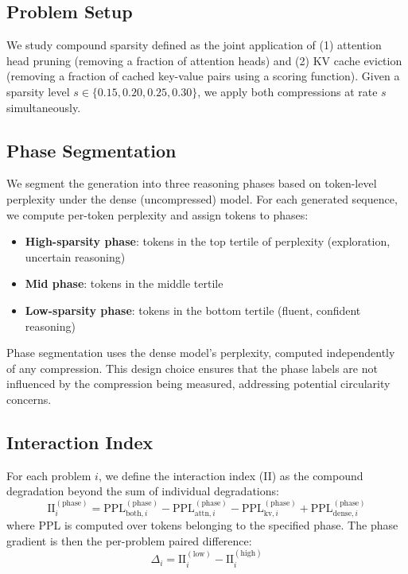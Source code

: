 \documentclass[11pt,a4paper]{article}
\begin{document}
\subsection{Problem Setup}

We study compound sparsity defined as the joint application of (1) attention head pruning (removing a fraction of attention heads) and (2) KV cache eviction (removing a fraction of cached key-value pairs using a scoring function). Given a sparsity level $s \in \{0.15, 0.20, 0.25, 0.30\}$, we apply both compressions at rate $s$ simultaneously.

\subsection{Phase Segmentation}

We segment the generation into three reasoning phases based on token-level perplexity under the dense (uncompressed) model. For each generated sequence, we compute per-token perplexity and assign tokens to phases:
\begin{itemize}
    \item \textbf{High-sparsity phase}: tokens in the top tertile of perplexity (exploration, uncertain reasoning)
    \item \textbf{Mid phase}: tokens in the middle tertile
    \item \textbf{Low-sparsity phase}: tokens in the bottom tertile (fluent, confident reasoning)
\end{itemize}

Phase segmentation uses the dense model's perplexity, computed independently of any compression. This design choice ensures that the phase labels are not influenced by the compression being measured, addressing potential circularity concerns.

\subsection{Interaction Index}

For each problem $i$, we define the interaction index (II) as the compound degradation beyond the sum of individual degradations:
\begin{equation}
\text{II}_i^{(\text{phase})} = \text{PPL}_{\text{both},i}^{(\text{phase})} - \text{PPL}_{\text{attn},i}^{(\text{phase})} - \text{PPL}_{\text{kv},i}^{(\text{phase})} + \text{PPL}_{\text{dense},i}^{(\text{phase})}
\end{equation}
where PPL is computed over tokens belonging to the specified phase. The phase gradient is then the per-problem paired difference:
\begin{equation}
\Delta_i = \text{II}_i^{(\text{low})} - \text{II}_i^{(\text{high})}
\end{equation}
\end{document}
